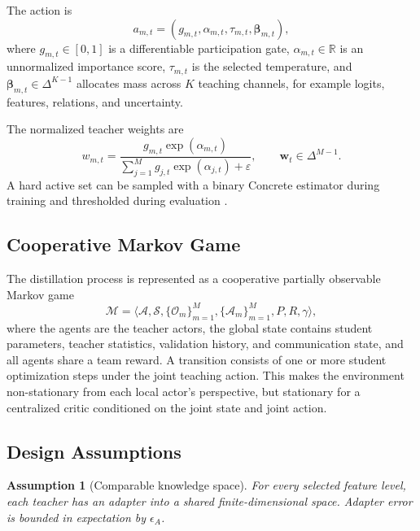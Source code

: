 \documentclass[10pt,twocolumn,a4paper]{article}
\newtheorem{assumption}{Assumption}
\newcommand{\R}{\mathbb{R}}
\newcommand{\cS}{\mathcal{S}}
\newcommand{\cA}{\mathcal{A}}
\newcommand{\cO}{\mathcal{O}}
\newcommand{\cM}{\mathcal{M}}
\newcommand{\simplex}{\Delta}
\begin{document}
The action is
\begin{equation}
 a_{m,t}=(g_{m,t},\alpha_{m,t},\tau_{m,t},\bm\beta_{m,t}),
\label{eq:action}
\end{equation}
where \(g_{m,t}\in[0,1]\) is a differentiable participation gate, \(\alpha_{m,t}\in\R\) is an unnormalized importance score, \(\tau_{m,t}\) is the selected temperature, and \(\bm\beta_{m,t}\in\simplex^{K-1}\) allocates mass across \(K\) teaching channels, for example logits, features, relations, and uncertainty.

The normalized teacher weights are
\begin{equation}
 w_{m,t}=\frac{g_{m,t}\exp(\alpha_{m,t})}{\sum_{j=1}^{M}g_{j,t}\exp(\alpha_{j,t})+\varepsilon},
\qquad \bm w_t\in\simplex^{M-1}.
\label{eq:weights}
\end{equation}
A hard active set can be sampled with a binary Concrete estimator during training and thresholded during evaluation \cite{jang2017}.

\subsection{Cooperative Markov Game}

The distillation process is represented as a cooperative partially observable Markov game
\begin{equation}
\cM=\langle \cA,\cS,\{\cO_m\}_{m=1}^{M},\{\cA_m\}_{m=1}^{M},P,R,\gamma\rangle,
\label{eq:markovgame}
\end{equation}
where the agents are the teacher actors, the global state contains student parameters, teacher statistics, validation history, and communication state, and all agents share a team reward. A transition consists of one or more student optimization steps under the joint teaching action. This makes the environment non-stationary from each local actor's perspective, but stationary for a centralized critic conditioned on the joint state and joint action.

\subsection{Design Assumptions}

\begin{assumption}[Comparable knowledge space]
For every selected feature level, each teacher has an adapter into a shared finite-dimensional space. Adapter error is bounded in expectation by \(\epsilon_A\).
\end{assumption}
\end{document}
